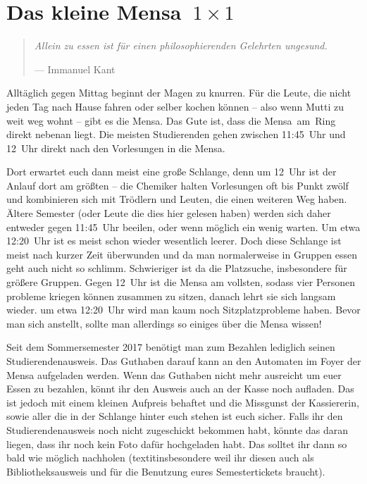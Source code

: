 \section[Das kleine Mensa~1~×~1]{\boldmath Das kleine Mensa~${1 \times 1}$}
\begin{multicols*}{2}
\begin{quote}
	\textit{Allein zu essen ist für einen philosophierenden Gelehrten ungesund.}
	
	\hfill--- Immanuel Kant
\end{quote}

Alltäglich gegen Mittag beginnt der Magen zu knurren.
Für die Leute, die nicht jeden Tag nach Hause fahren oder selber kochen können -- also wenn Mutti zu weit weg wohnt -- gibt es die Mensa.
Das Gute ist, dass die Mensa~am~Ring direkt nebenan liegt.
Die meisten Studierenden gehen zwischen 11:45~Uhr und 12~Uhr direkt nach den Vorlesungen in die Mensa.

Dort erwartet euch dann meist eine große Schlange, denn um 12~Uhr ist der Anlauf dort am größten – die Chemiker halten Vorlesungen oft bis Punkt zwölf und kombinieren sich mit Trödlern und Leuten, die einen weiteren Weg haben. Ältere Semester (oder Leute die dies hier gelesen haben) werden sich daher entweder gegen 11:45~Uhr beeilen, oder wenn möglich ein wenig warten. Um etwa 12:20~Uhr ist es meist schon wieder wesentlich leerer.
Doch diese Schlange ist meist nach kurzer Zeit überwunden und da man normalerweise in Gruppen essen geht auch nicht so schlimm. Schwieriger ist da die Platzsuche, insbesondere für größere Gruppen. Gegen 12~Uhr ist die Mensa am vollsten, sodass vier Personen probleme kriegen können zusammen zu sitzen, danach lehrt sie sich langsam wieder. um etwa 12:20~Uhr wird man kaum noch Sitzplatzprobleme haben.
Bevor man sich anstellt, sollte man allerdings so einiges über die Mensa wissen!

Seit dem Sommersemester 2017 benötigt man zum Bezahlen lediglich seinen Studierendenausweis.
Das Guthaben darauf kann an den Automaten im Foyer der Mensa aufgeladen werden.
Wenn das Guthaben nicht mehr ausreicht um euer Essen zu bezahlen, könnt ihr den Ausweis auch an der Kasse noch aufladen. 
Das ist jedoch mit einem kleinen Aufpreis behaftet und die Missgunst der Kassiererin, sowie aller die in der Schlange hinter euch stehen ist euch sicher.
Falls ihr den Studierendenausweis noch nicht zugeschickt bekommen habt, könnte das daran liegen, dass ihr noch kein Foto dafür hochgeladen habt.
Das solltet ihr dann so bald wie möglich nachholen (textit{insbesondere weil ihr diesen auch als Bibliotheksausweis und für die Benutzung eures Semestertickets braucht}).


\end{multicols*}
